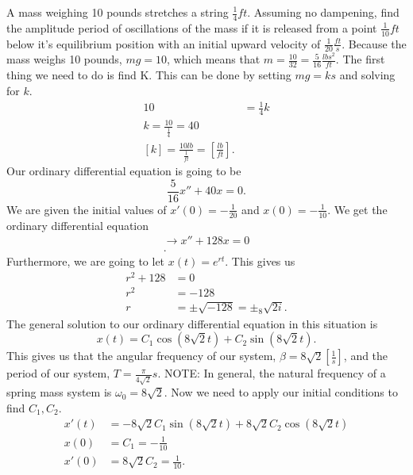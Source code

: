   \begin{eg}
    A mass weighing 10 pounds stretches a string $\frac{1}{4}ft$. Assuming no dampening, find the amplitude period of oscillations of the mass if it is released from a point $\frac{1}{10}ft$below it's equilibrium position with an initial upward velocity of $\frac{1}{20}\frac{ft}{s}$.\newline
    Because the mass weighs 10 pounds, $mg=10$, which means that $m=\frac{10}{32}=\frac{5}{16}\frac{lbs^2}{ft}$. The first thing we need to do is find K. This can be done by setting $mg=ks$ and solving for $k$.
    \begin{align*}
      10&=\frac{1}{4}k\\
      k=\frac{10}{\frac{1}{4}}=40\\
      [k]=\frac{10lb}{\frac{1}{ft}}=\left[\frac{lb}{ft}\right]
    .\end{align*}
    Our ordinary differential equation is going to be 
    \[
    \frac{5}{16}x''+40x=0
    .\] 
    We are given the initial values of $x'(0)=-\frac{1}{20}$ and $x(0)=-\frac{1}{10}$. We get the ordinary differential  equation 
    \begin{align*}
      \to x''+128x=0\\
    .\end{align*}
    Furthermore, we are going to let $x(t)=e^{rt}$. This gives us 
    \begin{align*}
      r^2+128&=0\\
      r^2&=-128\\
      r&=\pm\sqrt{-128}=\pm_8\sqrt{2i} 
    .\end{align*}
    The general solution to our ordinary differential equation in this situation is 
    \[
      x(t)=C_1\cos\left( 8\sqrt{2} t \right) +C_2\sin\left( 8\sqrt{2} t \right) 
    .\]
    This gives us that the angular frequency of our system, $\beta=8\sqrt{2} \left[ \frac{1}{s} \right] $, and the period of our system, $T=\frac{\pi}{4\sqrt{2} }s$.\newline
    NOTE: In general, the natural frequency of a spring mass system is $\omega_0=8\sqrt{2} $.\newline
    Now we need to apply our initial conditions to find $C_1,C_2 $.
    \begin{align*}
      x'(t)&=-8\sqrt{2} C_1\sin\left( 8\sqrt{2} t \right) +8\sqrt{2} C_2\cos\left( 8\sqrt{2} t \right) \\
      x(0)&=C_1=-\frac{1}{10}\\
      x'(0)&=8\sqrt{2} C_2=\frac{1}{10}
    .\end{align*}

\end{eg}
